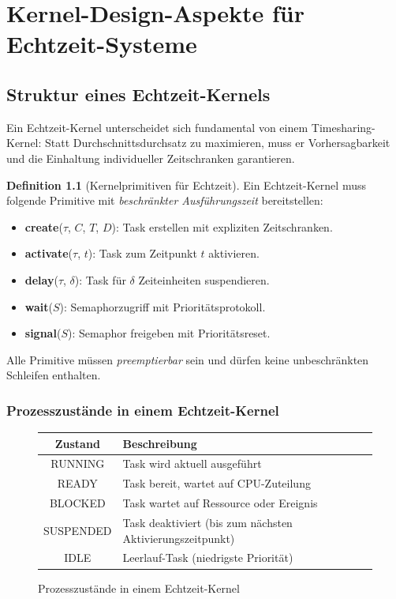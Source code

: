 ﻿\documentclass[a4paper,12pt]{report}
\theoremstyle{definition}
\newtheorem{definition}{Definition}[chapter]
\begin{document}
\chapter{Kernel-Design-Aspekte für Echtzeit-Systeme}
\label{chap:kernel}

\section{Struktur eines Echtzeit-Kernels}

Ein Echtzeit-Kernel unterscheidet sich fundamental von einem Timesharing-Kernel:
Statt Durchschnittsdurchsatz zu maximieren, muss er Vorhersagbarkeit und die
Einhaltung individueller Zeitschranken garantieren.

\begin{definition}[Kernelprimitiven für Echtzeit]
	Ein Echtzeit-Kernel muss folgende Primitive mit \emph{beschränkter Ausführungszeit}
	bereitstellen:
	\begin{itemize}
		\item \textbf{create}($\tau$, $C$, $T$, $D$): Task erstellen mit expliziten Zeitschranken.
		\item \textbf{activate}($\tau$, $t$): Task zum Zeitpunkt $t$ aktivieren.
		\item \textbf{delay}($\tau$, $\delta$): Task für $\delta$ Zeiteinheiten suspendieren.
		\item \textbf{wait}($S$): Semaphorzugriff mit Prioritätsprotokoll.
		\item \textbf{signal}($S$): Semaphor freigeben mit Prioritätsreset.
	\end{itemize}
	Alle Primitive müssen \emph{preemptierbar} sein und dürfen keine unbeschränkten
	Schleifen enthalten.
\end{definition}

\subsection{Prozesszustände in einem Echtzeit-Kernel}

\begin{figure}[H]
	\centering
	\begin{tabular}{|c|l|}
		\hline
		\textbf{Zustand} & \textbf{Beschreibung} \\
		\hline
		RUNNING   & Task wird aktuell ausgeführt \\
		READY     & Task bereit, wartet auf CPU-Zuteilung \\
		BLOCKED   & Task wartet auf Ressource oder Ereignis \\
		SUSPENDED & Task deaktiviert (bis zum nächsten Aktivierungszeitpunkt) \\
		IDLE      & Leerlauf-Task (niedrigste Priorität) \\
		\hline
	\end{tabular}
	\caption{Prozesszustände in einem Echtzeit-Kernel}
\end{figure}
\end{document}
